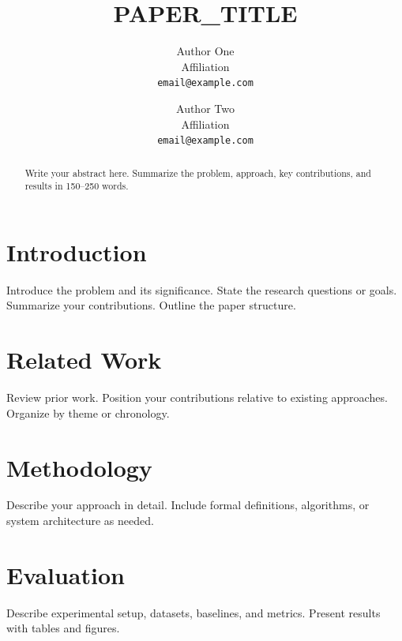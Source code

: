 \documentclass[11pt, letterpaper]{article}
\title{{{PAPER\_TITLE}}}
\author{
    {{Author One}} \\
    {{Affiliation}} \\
    \texttt{{{email@example.com}}}
    \and
    {{Author Two}} \\
    {{Affiliation}} \\
    \texttt{{{email@example.com}}}
}
\date{}
\begin{document}
\maketitle

\begin{abstract}
{{Write your abstract here. Summarize the problem, approach, key contributions, and results in 150--250 words.}}
\end{abstract}

\section{Introduction}
\label{sec:intro}

{{Introduce the problem and its significance. State the research questions or goals. Summarize your contributions. Outline the paper structure.}}

\section{Related Work}
\label{sec:related}

{{Review prior work. Position your contributions relative to existing approaches. Organize by theme or chronology.}}

\section{Methodology}
\label{sec:method}

{{Describe your approach in detail. Include formal definitions, algorithms, or system architecture as needed.}}

\section{Evaluation}
\label{sec:eval}

{{Describe experimental setup, datasets, baselines, and metrics. Present results with tables and figures.}}

\end{document}
